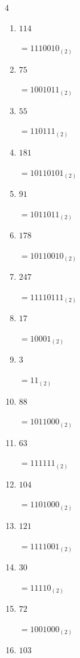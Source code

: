 \begin{multicols}{4}
\begin{enumerate}
        $=10010_{(2)}$

  \item $114$

        $=1110010_{(2)}$

  \item $75$

        $=1001011_{(2)}$

  \item $55$

        $=110111_{(2)}$

  \item $181$

        $=10110101_{(2)}$

  \item $91$

        $=1011011_{(2)}$

  \item $178$

        $=10110010_{(2)}$

  \item $247$

        $=11110111_{(2)}$

  \item $17$

        $=10001_{(2)}$

  \item $3$

        $=11_{(2)}$

  \item $88$

        $=1011000_{(2)}$

  \item $63$

        $=111111_{(2)}$

  \item $104$

        $=1101000_{(2)}$

\columnbreak %

  \item $121$

        $=1111001_{(2)}$

  \item $30$

        $=11110_{(2)}$

  \item $72$

        $=1001000_{(2)}$

  \item $103$


\end{enumerate}
\end{multicols}
